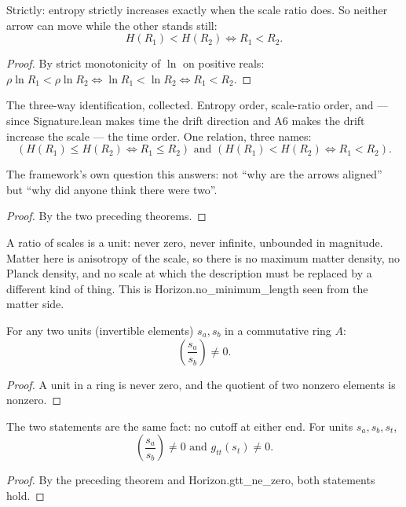 \begin{theorem}
Strictly: entropy strictly increases exactly when the scale ratio does.  So neither arrow can move while the other stands still:
\begin{equation}
H(R_1) < H(R_2) \iff R_1 < R_2.
\end{equation}
\begin{proof}
By strict monotonicity of $\ln$ on positive reals: $\rho \ln R_1 < \rho \ln R_2 \iff \ln R_1 < \ln R_2 \iff R_1 < R_2$.
\end{proof}
\end{theorem}

\begin{theorem}
The three-way identification, collected.  Entropy order, scale-ratio order, and — since Signature.lean makes time the drift direction and A6 makes the drift increase the scale — the time order.  One relation, three names:
\begin{equation}
(H(R_1) \le H(R_2) \iff R_1 \le R_2) \text{ and } (H(R_1) < H(R_2) \iff R_1 < R_2).
\end{equation}

The framework's own question this answers: not ``why are the arrows aligned'' but ``why did anyone think there were two''.
\begin{proof}
By the two preceding theorems.
\end{proof}
\end{theorem}

\begin{theorem}
A ratio of scales is a unit: never zero, never infinite, unbounded in magnitude.  Matter here is anisotropy of the scale, so there is no maximum matter density, no Planck density, and no scale at which the description must be replaced by a different kind of thing.  This is Horizon.no\_minimum\_length seen from the matter side.

For any two units (invertible elements) $s_a, s_b$ in a commutative ring $A$:
\begin{equation}
\left(\frac{s_a}{s_b}\right) \neq 0.
\end{equation}
\begin{proof}
A unit in a ring is never zero, and the quotient of two nonzero elements is nonzero.
\end{proof}
\end{theorem}

\begin{theorem}
The two statements are the same fact: no cutoff at either end. For units $s_a, s_b, s_t$,
\begin{equation}
\left(\frac{s_a}{s_b}\right) \neq 0 \text{ and } g_{tt}(s_t) \neq 0.
\end{equation}
\begin{proof}
By the preceding theorem and Horizon.gtt\_ne\_zero, both statements hold.
\end{proof}
\end{theorem}

